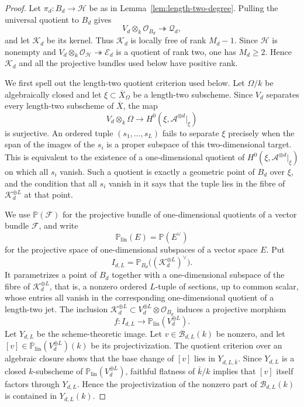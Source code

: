 \documentclass{lms}
\newcommand{\PP}{\mathbb P}
\newcommand{\Ample}{\mathcal A}
\newcommand{\OO}{\mathcal O}
\newcommand{\barX}{\overline{X}}
\begin{document}
\begin{proof}
Let $\pi_d:B_d\to\mathcal H$ be as in Lemma~\ref{lem:length-two-degree}.  Pulling the universal quotient to $B_d$ gives
\[
        V_d\otimes_k\OO_{B_d}\twoheadrightarrow\mathcal Q_d,
\]
and let $\mathcal K_d$ be its kernel.  Thus $\mathcal K_d$ is locally free of rank $M_d-1$.  Since $\mathcal H$ is nonempty and $V_d\otimes_k\OO_{\mathcal H}\twoheadrightarrow\mathcal E_d$ is a quotient of rank two, one has $M_d\ge2$.  Hence $\mathcal K_d$ and all the projective bundles used below have positive rank.

We first spell out the length-two quotient criterion used below.  Let $\Omega/k$ be algebraically closed and let $\xi\subset \barX_\Omega$ be a length-two subscheme.  Since $V_d$ separates every length-two subscheme of $\barX$, the map
\[
        V_d\otimes_k\Omega\longrightarrow H^0(\xi,\Ample^{\otimes d}|_\xi)
\]
is surjective.  An ordered tuple $(s_1,\ldots,s_L)$ fails to separate $\xi$ precisely when the span of the images of the $s_i$ is a proper subspace of this two-dimensional target.  This is equivalent to the existence of a one-dimensional quotient of $H^0(\xi,\Ample^{\otimes d}|_\xi)$ on which all $s_i$ vanish.  Such a quotient is exactly a geometric point of $B_d$ over $\xi$, and the condition that all $s_i$ vanish in it says that the tuple lies in the fibre of $\mathcal K_d^{\oplus L}$ at that point.

We use $\PP(\mathcal F)$ for the projective bundle of one-dimensional quotients of a vector bundle $\mathcal F$, and write
\[
        \PP_{\mathrm{lin}}(E)=\PP(E^\vee)
\]
for the projective space of one-dimensional subspaces of a vector space $E$.  Put
\[
        I_{d,L}=\PP_{B_d}\bigl((\mathcal K_d^{\oplus L})^\vee\bigr).
\]
It parametrizes a point of $B_d$ together with a one-dimensional subspace of the fibre of $\mathcal K_d^{\oplus L}$, that is, a nonzero ordered $L$-tuple of sections, up to common scalar, whose entries all vanish in the corresponding one-dimensional quotient of a length-two jet.  The inclusion $\mathcal K_d^{\oplus L}\subset V_d^{\oplus L}\otimes\OO_{B_d}$ induces a projective morphism
\[
        f:I_{d,L}\longrightarrow \PP_{\mathrm{lin}}(V_d^{\oplus L}).
\]
Let $Y_{d,L}$ be the scheme-theoretic image.  Let $v\in\mathcal B_{d,L}(k)$ be nonzero, and let $[v]\in\PP_{\mathrm{lin}}(V_d^{\oplus L})(k)$ be its projectivization.  The quotient criterion over an algebraic closure shows that the base change of $[v]$ lies in $Y_{d,L,\bar k}$.  Since $Y_{d,L}$ is a closed $k$-subscheme of $\PP_{\mathrm{lin}}(V_d^{\oplus L})$, faithful flatness of $\bar k/k$ implies that $[v]$ itself factors through $Y_{d,L}$.  Hence the projectivization of the nonzero part of $\mathcal B_{d,L}(k)$ is contained in $Y_{d,L}(k)$.


\end{proof}
\end{document}
